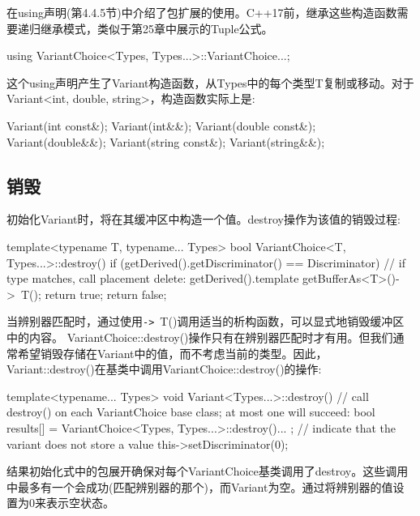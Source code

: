 \begin{notice}
在using声明(第4.4.5节)中介绍了包扩展的使用。C++17前，继承这些构造函数需要递归继承模式，类似于第25章中展示的Tuple公式。
\end{notice}

\begin{cpp}
using VariantChoice<Types, Types...>::VariantChoice...;
\end{cpp}

这个using声明产生了Variant构造函数，从Types中的每个类型T复制或移动。对于Variant<int, double, string>，构造函数实际上是:

\begin{cpp}
Variant(int const&);
Variant(int&&);
Variant(double const&);
Variant(double&&);
Variant(string const&);
Variant(string&&);
\end{cpp}

\subsection{销毁}

初始化Variant时，将在其缓冲区中构造一个值。destroy操作为该值的销毁过程:

\begin{cpp}
template<typename T, typename... Types>
bool VariantChoice<T, Types...>::destroy() {
	if (getDerived().getDiscriminator() == Discriminator) {
		// if type matches, call placement delete:
		getDerived().template getBufferAs<T>()->~T();
		return true;
	}
	return false;
}
\end{cpp}

当辨别器匹配时，通过使用\texttt{->}~T()调用适当的析构函数，可以显式地销毁缓冲区中的内容。 
VariantChoice::destroy()操作只有在辨别器匹配时才有用。但我们通常希望销毁存储在Variant中的值，而不考虑当前的类型。因此，Variant::destroy()在基类中调用VariantChoice::destroy()的操作:

\begin{cpp}
template<typename... Types>
void Variant<Types...>::destroy() {
	// call destroy() on each VariantChoice base class; at most one will succeed:
	bool results[] = {
		VariantChoice<Types, Types...>::destroy()...
	};
	// indicate that the variant does not store a value
	this->setDiscriminator(0);
}
\end{cpp}

结果初始化式中的包展开确保对每个VariantChoice基类调用了destroy。这些调用中最多有一个会成功(匹配辨别器的那个)，而Variant为空。通过将辨别器的值设置为0来表示空状态。


